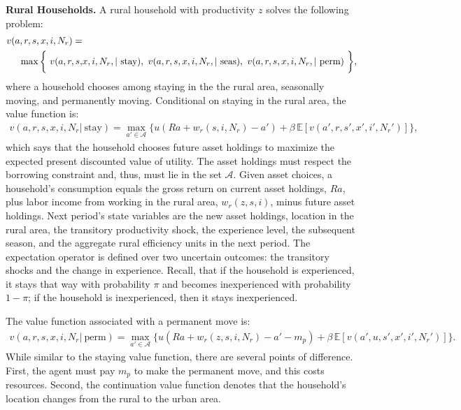 \documentclass[pdftex,11pt]{article}
\begin{document}
\textbf{Rural Households.} A rural household with productivity $z$ solves the following problem:
\begin{align}
\small
v(a, r, s, x, i, N_r) =& \nonumber \\
  \max \bigg\{ \ v(a, r,  s, & x, i, N_r, | \ \mbox{stay}),  \ v(a, r, s, x, i, N_r, | \ \mbox{seas}),\  v(a, r, s, x, i, N_r, | \ \mbox{perm}) \ \bigg \},
\label{eq:value_fun_rural}
\end{align}
where a household chooses among staying in the the rural area, seasonally moving, and permanently moving. Conditional on staying in the rural area, the value function is:
\begin{align}
v(a, r, s, x, i, N_r | \ \mbox{stay}) =  \max_{a'\in \mathcal{A}}\bigg  \{ u(Ra + w_{r}(s, i, N_r) - a' ) + \beta \, \mathbb{E} [v(a',r, s',x',i',N_r')]  \bigg\},
\label{eq:bellman_rural_stay}
\end{align}
which says that the household chooses future asset holdings to maximize the expected present discounted value of utility. The asset holdings must respect the borrowing constraint and, thus, must lie in the set $\mathcal{A}$. Given asset choices, a household's consumption equals the gross return on current asset holdings, $Ra$, plus labor income from working in the rural area, $w_{r}(z, s, i)$, minus future asset holdings. Next period's state variables are the new asset holdings, location in the rural area, the transitory productivity shock, the experience level, the subsequent season, and the aggregate rural efficiency units in the next period. The expectation operator is defined over two uncertain outcomes: the transitory shocks and the change in experience. Recall, that if the household is experienced, it stays that way with probability $\pi$ and becomes inexperienced with probability $1-\pi$; if the household is inexperienced, then it stays inexperienced.

The value function associated with a permanent move is:
\begin{align}
v(a, r, s, x, i, N_r | \ \mbox{perm})  = \max_{a'\in \mathcal{A}} \bigg\{ u(Ra + w_r(z, s, i, N_r) - a' - m_{p} ) + \beta \, \mathbb{E} [v(a',u, s', x', i',N_r')] \bigg\}.
\nonumber
\end{align}
While similar to the staying value function, there are several points of difference. First, the agent must pay $m_p$ to make the permanent move, and this costs resources. Second, the continuation value function denotes that the household's location changes from the rural to the urban area.
\end{document}
